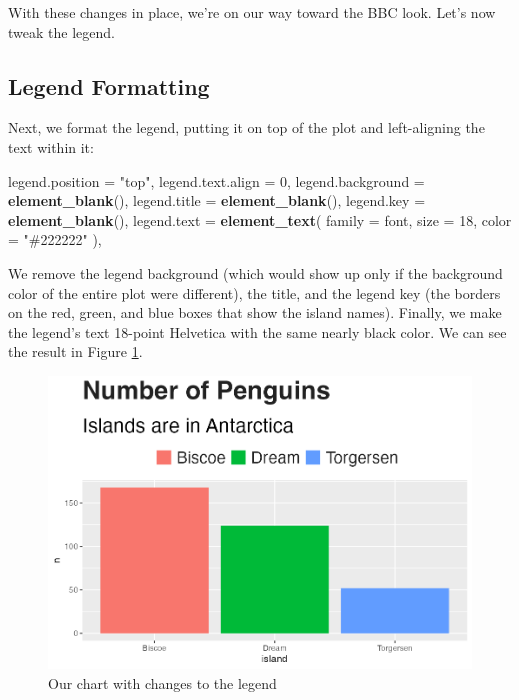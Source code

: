 \documentclass[
]{book}
\newenvironment{Shaded}{\begin{snugshade}}{\end{snugshade}}
\newcommand{\AttributeTok}[1]{\textcolor[rgb]{0.13,0.29,0.53}{#1}}
\newcommand{\DecValTok}[1]{\textcolor[rgb]{0.00,0.00,0.81}{#1}}
\newcommand{\FunctionTok}[1]{\textcolor[rgb]{0.13,0.29,0.53}{\textbf{#1}}}
\newcommand{\NormalTok}[1]{#1}
\newcommand{\OtherTok}[1]{\textcolor[rgb]{0.56,0.35,0.01}{#1}}
\newcommand{\StringTok}[1]{\textcolor[rgb]{0.31,0.60,0.02}{#1}}
\begin{document}
With these changes in place, we're on our way toward the BBC look. Let's now tweak the legend.

\hypertarget{legend-formatting}{%
\subsection*{Legend Formatting}\label{legend-formatting}}

Next, we format the legend, putting it on top of the plot and left-aligning the text within it:

\begin{Shaded}
\begin{Highlighting}[]
\NormalTok{legend.position }\OtherTok{=} \StringTok{"top"}\NormalTok{,}
\NormalTok{legend.text.align }\OtherTok{=} \DecValTok{0}\NormalTok{,}
\NormalTok{legend.background }\OtherTok{=} \FunctionTok{element\_blank}\NormalTok{(),}
\NormalTok{legend.title }\OtherTok{=} \FunctionTok{element\_blank}\NormalTok{(),}
\NormalTok{legend.key }\OtherTok{=} \FunctionTok{element\_blank}\NormalTok{(),}
\NormalTok{legend.text }\OtherTok{=} \FunctionTok{element\_text}\NormalTok{(}
  \AttributeTok{family =}\NormalTok{ font,}
  \AttributeTok{size =} \DecValTok{18}\NormalTok{,}
  \AttributeTok{color =} \StringTok{"\#222222"}
\NormalTok{),}
\end{Highlighting}
\end{Shaded}

We remove the legend background (which would show up only if the background color of the entire plot were different), the title, and the legend key (the borders on the red, green, and blue boxes that show the island names). Finally, we make the legend's text 18-point Helvetica with the same nearly black color. We can see the result in Figure \ref{fig:penguins-plot-legend-plot}.

\begin{figure}
\includegraphics[width=1\linewidth]{custom-theme_files/figure-latex/penguins-plot-legend-plot-1} \caption{Our chart with changes to the legend}\label{fig:penguins-plot-legend-plot}
\end{figure}
\end{document}
